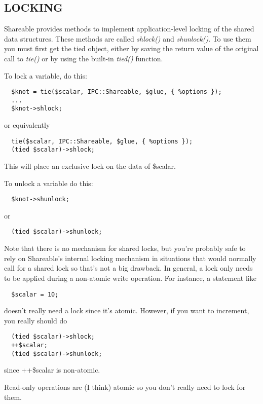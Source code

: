 \subsection*{LOCKING}%

Shareable provides methods to implement application-level locking of
the shared data structures.  These methods are called {\em shlock()\/} and
{\em shunlock()\/}.  To use them you must first get the tied object, either by
saving the return value of the original call to {\em tie()\/} or by using the
built-in {\em tied()\/} function.

To lock a variable, do this:
\begin{verbatim}
  $knot = tie($scalar, IPC::Shareable, $glue, { %options });
  ...
  $knot->shlock;
\end{verbatim}

or equivalently
\begin{verbatim}
  tie($scalar, IPC::Shareable, $glue, { %options });
  (tied $scalar)->shlock;
\end{verbatim}

This will place an exclusive lock on the data of \$scalar.

To unlock a variable do this:
\begin{verbatim}
  $knot->shunlock;
\end{verbatim}

or
\begin{verbatim}
  (tied $scalar)->shunlock;
\end{verbatim}

Note that there is no mechanism for shared locks, but you're probably
safe to rely on Shareable's internal locking mechanism in situations
that would normally call for a shared lock so that's not a big
drawback.  In general, a lock only needs to be applied during a
non-atomic write operation.  For instance, a statement like
\begin{verbatim}
  $scalar = 10;
\end{verbatim}

doesn't really need a lock since it's atomic.  However, if you want to
increment, you really should do
\begin{verbatim}
  (tied $scalar)->shlock;
  ++$scalar;
  (tied $scalar)->shunlock;
\end{verbatim}

since ++\$scalar is non-atomic.

Read-only operations are (I think) atomic so you don't really need to
lock for them.

